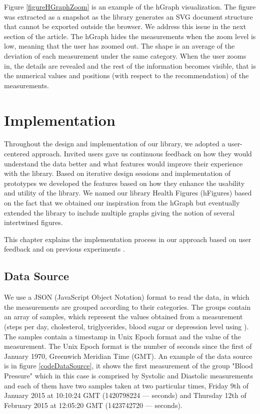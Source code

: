 \documentclass[twocolumn]{bmcart}%
\begin{document}
Figure \ref{figureHGraphZoom} is an example of the hGraph visualization. The figure was extracted as a snapshot as the library generates an SVG document structure that cannot be exported outside the browser. We address this issue in the next section of the article. The hGraph hides the measurements when the zoom level is low, meaning that the user has zoomed out. The shape is an average of the deviation of each measurement under the same category. When the user zooms in, the details are revealed and the rest of the information becomes visible, that is the numerical values and positions (with respect to the recommendation) of the measurements.

\section*{Implementation} 

Throughout the design and implementation of our library, we adopted a user-centered approach. Invited users gave us continuous feedback on how they would understand the data better and what features would improve their experience with the library. Based on iterative design sessions and implementation of prototypes we developed the features based on how they enhance the usability and utility of the library. We named our library Health Figures (hFigures) based on the fact that we obtained our inspiration from the hGraph but eventually extended the library to include multiple graphs giving the notion of several intertwined figures.

This chapter explains the implementation process in our approach based on user feedback and on previous experiments \cite{EMBCLedNiem}. 


\subsection*{Data Source}

We use a JSON (JavaScript Object Notation) format to read the data, in which the measurements are grouped according to their categories. The groups contain an array of samples, which represent the values obtained from a measurement (steps per day, cholesterol, triglycerides, blood sugar or depression level using \cite{poutanen2010validity}). The samples contain a timestamp in Unix Epoch format and the value of the measurement. The Unix Epoch format is the number of seconds since the first of January 1970, Greenwich Meridian Time (GMT). An example of the data source is in figure \ref{codeDataSource}, it shows the first measurement of the group "Blood Pressure" which in this case is comprised by Systolic and Diastolic measurements and each of them have two samples taken at two particular times, Friday 9th of January 2015 at 10:10:24 GMT (1420798224 --- seconds) and Thursday 12th of February 2015 at 12:05:20 GMT (1423742720 --- seconds).
\end{document}
